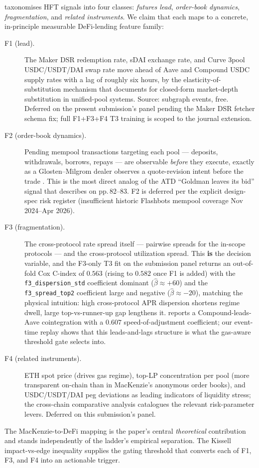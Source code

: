 \cite[Table 3.2, p.\,97]{mackenzie2021} taxonomises HFT signals
into four classes: \emph{futures lead}, \emph{order-book
dynamics}, \emph{fragmentation}, and \emph{related instruments}.
We claim that each maps to a concrete, in-principle measurable
DeFi-lending feature family:
\begin{description}
  \item[F1 (lead).] The Maker DSR redemption rate, sDAI exchange
    rate, and Curve 3pool USDC/USDT/DAI swap rate move ahead of
    Aave and Compound USDC supply rates with a lag of roughly six
    hours, by the elasticity-of-substitution mechanism that
    \cite{krause2005} documents for closed-form market-depth
    substitution in unified-pool systems.  Source: subgraph
    events, free.  Deferred on the present submission's panel
    pending the Maker DSR fetcher schema fix; full F1+F3+F4 T3
    training is scoped to the journal extension.
  \item[F2 (order-book dynamics).] Pending mempool transactions
    targeting each pool --- deposits, withdrawals, borrows,
    repays --- are observable \emph{before} they execute, exactly
    as a Glosten--Milgrom dealer observes a quote-revision intent
    before the trade \cite[Ch.\,3]{ohara1995}.  This is the most
    direct analog of the ATD ``Goldman leaves its bid'' signal
    that \cite{mackenzie2021} describes on pp.\,82--83.  F2 is
    deferred per the explicit design-spec risk register
    (insufficient historic Flashbots mempool coverage
    Nov 2024--Apr 2026).
  \item[F3 (fragmentation).] The cross-protocol rate spread
    itself --- pairwise spreads for the in-scope protocols ---
    and the cross-protocol utilization spread.  This \textbf{is}
    the decision variable, and the F3-only T3 fit on the
    submission panel returns an out-of-fold Cox C-index of $0.563$
    (rising to $0.582$ once F1 is added) with the
    \texttt{f3\_dispersion\_std} coefficient dominant
    ($\hat{\beta} \approx +60$) and the
    \texttt{f3\_spread\_top2} coefficient large and negative
    ($\hat{\beta} \approx -20$), matching the physical
    intuition: high cross-protocol APR dispersion shortens regime
    dwell, large top-vs-runner-up gap lengthens it.
    \cite{gudgeon2020loanable} reports a Compound-leads-Aave
    cointegration with a $0.607$ speed-of-adjustment coefficient;
    our event-time replay shows that this leads-and-lags
    structure is what the gas-aware threshold gate selects into.
  \item[F4 (related instruments).] ETH spot price (drives gas
    regime), top-LP concentration per pool (more transparent
    on-chain than in MacKenzie's anonymous order books), and
    USDC/USDT/DAI peg deviations as leading indicators of
    liquidity stress; the
    \cite{aavecompoundcrosschain2025} cross-chain comparative
    analysis catalogues the relevant risk-parameter levers.
    Deferred on this submission's panel.
\end{description}
The MacKenzie-to-DeFi mapping is the paper's central
\emph{theoretical} contribution and stands independently of the
ladder's empirical separation.  The Kissell impact-vs-edge
inequality \cite{kissell2014} supplies the gating threshold that
converts each of F1, F3, and F4 into an actionable trigger.

